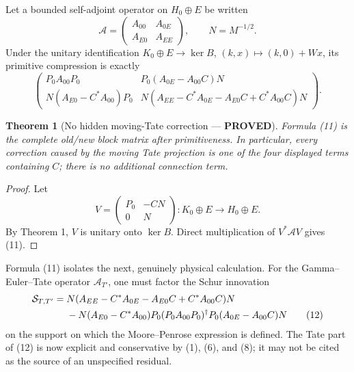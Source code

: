 \documentclass[11pt]{article}
\newcommand{\PROVED}{\textcolor{green!40!black}{\textbf{PROVED}}}
\newtheorem{theorem}{Theorem}
\begin{document}
Let a bounded self-adjoint operator on $H_0\oplus E$ be written
\begin{equation}
 \mathcal A=
 \begin{pmatrix}A_{00}&A_{0E}\\A_{E0}&A_{EE}\end{pmatrix},
 \qquad N=M^{-1/2}.                                         \tag{10}
\end{equation}
Under the unitary identification
$K_0\oplus E\to\ker B$, $(k,x)\mapsto(k,0)+Wx$, its primitive
compression is exactly
\begin{equation}
 \begin{pmatrix}
  P_0A_{00}P_0& P_0(A_{0E}-A_{00}C)N\\
  N(A_{E0}-C^*A_{00})P_0&
  N(A_{EE}-C^*A_{0E}-A_{E0}C+C^*A_{00}C)N
 \end{pmatrix}.                                             \tag{11}
\end{equation}

\begin{theorem}[No hidden moving-Tate correction --- \PROVED]
Formula (11) is the complete old/new block matrix after primitiveness.
In particular, every correction caused by the moving Tate projection is
one of the four displayed terms containing $C$; there is no additional
connection term.
\end{theorem}

\begin{proof}
Let
\[
 V=\begin{pmatrix}P_0&-CN\\0&N\end{pmatrix}:K_0\oplus E
        \longrightarrow H_0\oplus E.
\]
By Theorem 1, $V$ is unitary onto $\ker B$.  Direct multiplication of
$V^*\mathcal AV$ gives (11).
\end{proof}

Formula (11) isolates the next, genuinely physical calculation.  For the
Gamma--Euler--Tate operator $\mathcal A_{T'}$, one must factor the Schur
innovation
\begin{align}
 \mathcal S_{T,T'}={}&
 N(A_{EE}-C^*A_{0E}-A_{E0}C+C^*A_{00}C)N \notag\\
 &-N(A_{E0}-C^*A_{00})P_0
   (P_0A_{00}P_0)^\dagger
   P_0(A_{0E}-A_{00}C)N                                    \tag{12}
\end{align}
on the support on which the Moore--Penrose expression is defined.
The Tate part of (12) is now explicit and conservative by (1), (6), and
(8); it may not be cited as the source of an unspecified residual.
\end{document}
